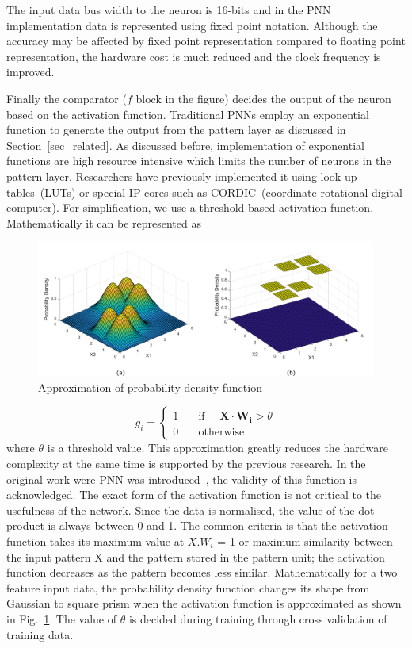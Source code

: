 The input data bus width to the neuron is 16-bits and in the PNN implementation data is represented using fixed point notation.
Although the accuracy may be affected by fixed point representation compared to floating point representation, the hardware cost is much reduced and the clock frequency is improved.

Finally the comparator ($f$ block in the figure) decides the output of the neuron based on the activation function.
Traditional PNNs employ an exponential function to generate the output from the pattern layer as discussed in Section~\ref{sec_related}.
As discussed before, implementation of exponential functions are high resource intensive which limits the number of neurons in the pattern layer.
Researchers have previously implemented it using look-up-tables~(LUTs) or special IP cores such as CORDIC~(coordinate rotational digital computer).
For simplification, we use a threshold based activation function.
Mathematically it can be represented as


\begin{figure}[t]
\centering
   \includegraphics[height=0.45\columnwidth]{Figures/pdf.pdf}
   \caption{Approximation of probability density function}
   \label{fig:pdf}
\end{figure}

\begin{equation}
\label{e2}
 g_{i}=
  \begin{cases}
    1       & \quad \text{if } \quad {\boldsymbol{X\cdot W_{i}}} > \theta \\
    0  & \quad \text{otherwise} 
  \end{cases}
\end{equation}
where $\theta$ is a threshold value.
This approximation greatly reduces the hardware complexity at the same time is supported by the previous research.
In the original work were PNN was introduced~\citep{specht1990}, the validity of this function is acknowledged.
The exact form of the activation function is not critical to the usefulness of the network. 
Since the data is normalised, the value of the dot product is always between 0 and 1.
The common criteria is that the activation function takes its maximum value at $X.W_i$ = 1 or maximum similarity between the input pattern X and the pattern stored in the pattern unit; the activation function decreases as the pattern becomes less similar.
Mathematically for a two feature input data, the probability density function changes its shape from Gaussian to square prism when the activation function is approximated as shown in Fig.~\ref{fig:pdf}.
The value of $\theta$ is decided during training through cross validation of training data.

